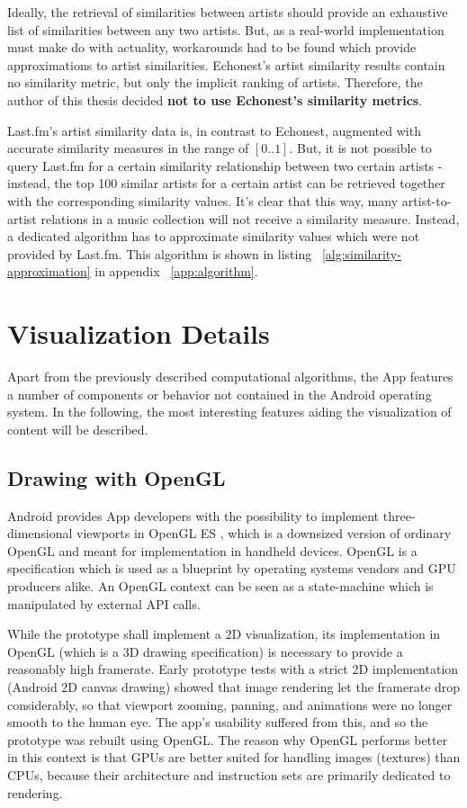 Ideally, the retrieval of similarities between artists should provide an exhaustive list of similarities between any two artists. But, as a real-world implementation must make do with actuality, workarounds had to be found which provide approximations to artist similarities.
Echonest's artist similarity results contain no similarity metric, but only the implicit ranking of artists. Therefore, the author of this thesis decided \textbf{not to use Echonest's similarity metrics}.

Last.fm's artist similarity data is, in contrast to Echonest, augmented with accurate similarity measures in the range of $[0 .. 1]$. But, it is not possible to query Last.fm for a certain similarity relationship between two certain artists - instead, the top 100 similar artists for a certain artist can be retrieved together with the corresponding similarity values. It's clear that this way, many artist-to-artist relations in a music collection will not receive a similarity measure. Instead, a dedicated algorithm has to approximate similarity values which were not provided by Last.fm. This algorithm is shown in listing ~\ref{alg:similarity-approximation} in  appendix ~\ref{app:algorithm}.


\section{Visualization Details}

Apart from the previously described computational algorithms, the App features a number of components or behavior not contained in the Android operating system. In the following, the most interesting features aiding the visualization of content will be described.

\subsection{Drawing with OpenGL}

Android provides App developers with the possibility to implement three-dimensional viewports in OpenGL ES \cite{url:opengles}, which is a downsized version of ordinary OpenGL and meant for implementation in handheld devices. OpenGL is a specification which is used as a blueprint by operating systems vendors and GPU producers alike. An OpenGL context can be seen as a state-machine which is manipulated by external API calls.

While the prototype shall implement a 2D visualization, its implementation in OpenGL (which is a 3D drawing specification) is necessary to provide a reasonably high framerate. Early prototype tests with a strict 2D implementation (Android 2D canvas drawing) showed that image rendering let the framerate drop considerably, so that viewport zooming, panning, and animations were no longer smooth to the human eye. The app's usability suffered from this, and so the prototype was rebuilt using OpenGL. The reason why OpenGL performs better in this context is that GPUs are better suited for handling images (textures) than CPUs, because their architecture and instruction sets are primarily dedicated to rendering.

